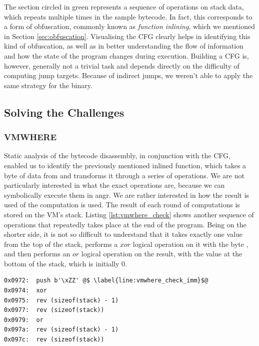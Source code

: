 The section circled in green represents a sequence of operations on stack data, which repeats multiple times in the sample bytecode. In fact, this corresponds to a form of obfuscation, commonly known as \emph{function inlining}, which we mentioned in Section \ref{sec:obfuscation}. Visualising the \gls{CFG} clearly helps in identifying this kind of obfuscation, as well as in better understanding the flow of information and how the state of the program changes during execution. Building a \gls{CFG} is, however, generally not a trivial task and depends directly on the difficulty of computing jump targets. Because of indirect jumps, we weren't able to apply the same strategy for the  binary.

\subsection{Solving the Challenges}

\subsubsection{VMWHERE}

Static analysis of the bytecode disassembly, in conjunction with the \gls{CFG}, enabled us to identify the previously mentioned inlined function, which takes a byte of data from  and transforms it through a series of operations. We are not particularly interested in what the exact operations are, because we can symbolically execute them in angr. We are rather interested in how the result is used of the computation is used. The result of each round of computations is stored on the \gls{VM}'s stack. Listing \ref{lst:vmwhere_check} shows another sequence of operations that repeatedly takes place at the end of the program. Being on the shorter side, it is not so difficult to understand that it takes exactly one value from the top of the stack, performs a $xor$ logical operation on it with the byte \cc{\xZZ}, and then performs an $or$ logical operation on the result, with the value at the bottom of the stack, which is initially $0$.

\begin{lstlisting}[label={lst:vmwhere_check}, caption={Disassembly of \cc{vmwhere} bytecode, which performs a bitwise-xor operation on the top two values on top of the stack, and then a bitwise-or operation on the previous result, and the value at the bottom of the stack.}]
0x0972:  push b'\xZZ' @$ \label{line:vmwhere_check_imm}$@
0x0974:  xor
0x0975:  rev (sizeof(stack) - 1)
0x0977:  rev (sizeof(stack))
0x0979:  or
0x097a:  rev (sizeof(stack) - 1)
0x097c:  rev (sizeof(stack))
\end{lstlisting}

